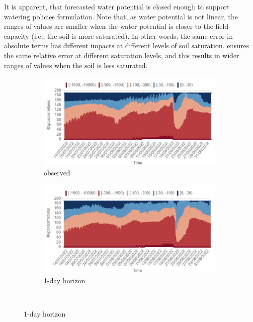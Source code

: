 It is apparent, that forecasted water potential is closed enough to support watering policies formulation. Note that, as water potential is not linear, the ranges of values are smaller when the water potential is closer to the field capacity (i.e., the soil is more saturated). In other words, the same error in absolute terms has different impacts at different levels of soil saturation. \olab{} ensures the same relative error at different saturation levels, and this results in wider ranges of values when the soil is less saturated.

\begin{figure}[t]
    \begin{subfigure}[b]{0.47\textwidth}
        \includegraphics[width=\textwidth]{chapters/physics-aware/orchard/img/obs_stacked.pdf}
        \caption{observed}
        \label{orchard-fig:stacked_a}
    \end{subfigure}
    \hfill
    \begin{subfigure}[b]{0.47\textwidth}
        \includegraphics[width=\textwidth]{chapters/physics-aware/orchard/img/1gg_stacked.pdf}
        \caption{1-day horizon}
        \label{orchard-fig:stacked_b}
    \end{subfigure}
    \\

\end{figure}
